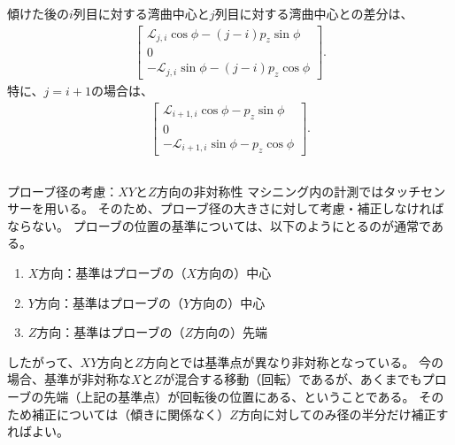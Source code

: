 \begin{hosokubox}
傾けた後の$i$列目に対する湾曲中心と$j$列目に対する湾曲中心との差分は、
\begin{align*}
  \left[
  \begin{array}{c}
    \mathcal L_{j,i}\cos\phi-(j-i)p_z\sin\phi\\
    0\\
    -\mathcal L_{j,i}\sin\phi-(j-i)p_z\cos\phi
  \end{array}
  \right].
\end{align*}
特に、$j = i+1$の場合は、
\begin{align*}
  \left[
  \begin{array}{c}
    \mathcal L_{i+1,i}\cos\phi-p_z\sin\phi\\
    0\\
    -\mathcal L_{i+1,i}\sin\phi-p_z\cos\phi
  \end{array}
  \right].
\end{align*}
\end{hosokubox}
\begin{Column}{プローブ径の考慮：$XY$と$Z$方向の非対称性}
マシニング内の計測ではタッチセンサーを用いる。
そのため、プローブ径の大きさに対して考慮・補正しなければならない。
プローブの位置の基準については、以下のようにとるのが通常である。
\begin{enumerate}
\item $X$方向：基準はプローブの（$X$方向の）中心
\item $Y$方向：基準はプローブの（$Y$方向の）中心
\item $Z$方向：基準はプローブの（$Z$方向の）先端
\end{enumerate}
したがって、$XY$方向と$Z$方向とでは基準点が異なり非対称となっている。
今の場合、基準が非対称な$X$と$Z$が混合する移動（回転）であるが、あくまでもプローブの先端（上記の基準点）が回転後の位置にある、ということである。
そのため補正については（傾きに関係なく）$Z$方向に対してのみ径の半分だけ補正すればよい。
\end{Column}




